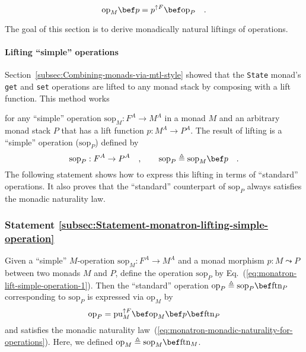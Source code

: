 ~\vspace{-0.45\baselineskip}
\begin{equation}
\text{op}_{M}\bef p=p^{\uparrow F}\bef\text{op}_{P}\quad.\label{eq:monatron-monadic-naturality-for-operations}
\end{equation}

\noindent The goal of this section is to derive monadically natural
liftings of operations.

\paragraph{Lifting \textsf{``}simple\textsf{''} operations}

Section~\ref{subsec:Combining-monads-via-mtl-style} showed that
the \lstinline!State! monad\textsf{'}s \lstinline!get! and \lstinline!set!
operations are lifted to any monad stack by composing with a lift
function. This method works %
\begin{comment}
equally well 
\end{comment}
for any \textsf{``}simple\textsf{''} operation $\text{sop}_{M}:F^{A}\rightarrow M^{A}$
in a monad $M$ and an arbitrary monad stack $P$ that has a lift
function $p:M^{A}\rightarrow P^{A}$. The result of lifting is a \textsf{``}simple\textsf{''}
operation ($\text{sop}_{P}$) defined by
\begin{equation}
\text{sop}_{P}:F^{A}\rightarrow P^{A}\quad,\quad\quad\text{sop}_{P}\triangleq\text{sop}_{M}\bef p\quad.\label{eq:monatron-lift-simple-operation-1}
\end{equation}
The following statement shows how to express this lifting in terms
of \textsf{``}standard\textsf{''} operations. It also proves that the \textsf{``}standard\textsf{''}
counterpart of $\text{sop}_{P}$ always satisfies the monadic naturality
law.

\subsubsection{Statement \label{subsec:Statement-monatron-lifting-simple-operation}\ref{subsec:Statement-monatron-lifting-simple-operation}}

Given a \textsf{``}simple\textsf{''} $M$-operation $\text{sop}_{M}:F^{A}\rightarrow M^{A}$
and a monad morphism $p:M\leadsto P$ between two monads $M$ and
$P$, define the operation $\text{sop}_{P}$ by Eq.~(\ref{eq:monatron-lift-simple-operation-1}).
Then the \textsf{``}standard\textsf{''} operation $\text{op}_{P}\triangleq\text{sop}_{P}\bef\text{ftn}_{P}$
corresponding to $\text{sop}_{P}$ is expressed via $\text{op}_{M}$
by
\begin{equation}
\text{op}_{P}=\text{pu}_{M}^{\uparrow F}\bef\text{op}_{M}\bef p\bef\text{ftn}_{P}\label{eq:monatron-lifting-simple-op}
\end{equation}
and satisfies the monadic naturality law~(\ref{eq:monatron-monadic-naturality-for-operations}).
Here, we defined $\text{op}_{M}\triangleq\text{sop}_{M}\bef\text{ftn}_{M}$.


